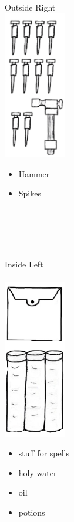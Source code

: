 \documentclass[11pt]{article}
\begin{document}
\begin{minipage}[t]{.248\textwidth}
    \normalsize{Outside Right}\\
    \includegraphics[height=6.5cm]{img/HammerAndPitons.png}\\
        \begin{itemize}[topsep=0pt, itemsep=0pt, partopsep=0pt, parsep=0pt]
            \item Hammer
            \item Spikes
        \end{itemize}
\end{minipage}
\\
\vspace{1.5cm}
\\
\begin{minipage}[t]{.05\textwidth}
    \ 
\end{minipage}
\begin{minipage}[t]{.248\textwidth}
    \normalsize{Inside Left}\\
    \\
    \includegraphics[height=7.0cm]{img/Scrolls-herbs.png}\\
    \begin{normalsize}
        \begin{itemize}[topsep=0pt, itemsep=0pt, partopsep=0pt, parsep=0pt]
            \item stuff for spells
            \item holy water
            \item oil
            \item potions
        \end{itemize}
        \end{normalsize}
\end{minipage}
\end{document}
